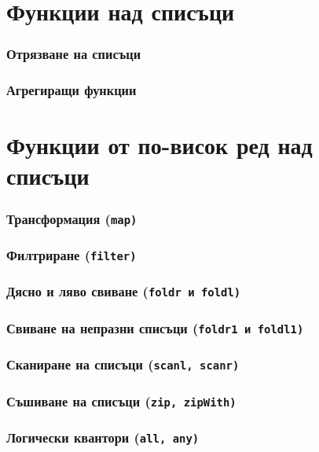 \documentclass{beamer}
\begin{document}
\section{Функции над списъци}

\begin{frame}
  \frametitle{Отрязване на списъци}
\end{frame}

\begin{frame}
  \frametitle{Агрегиращи функции}
\end{frame}

\section{Функции от по-висок ред над списъци}

\begin{frame}
  \frametitle{Трансформация (\tt{map})}
  
\end{frame}

\begin{frame}
  \frametitle{Филтриране (\tt{filter})}
  
\end{frame}

\begin{frame}
  \frametitle{Дясно и ляво свиване (\tt{foldr} и \tt{foldl})}
  
\end{frame}

\begin{frame}
  \frametitle{Свиване на непразни списъци (\tt{foldr1} и \tt{foldl1})}
  
\end{frame}

\begin{frame}
  \frametitle{Сканиране на списъци (\tt{scanl}, \tt{scanr})}
  
\end{frame}


\begin{frame}
  \frametitle{Съшиване на списъци (\tt{zip}, \tt{zipWith})}
  
\end{frame}

\begin{frame}
  \frametitle{Разбиване на списъци (\tt{break}, \tt{span}, \tt{takeWhile}, \tt{dropWhile}) 
  
\end{frame}

\begin{frame}
  \frametitle{Логически квантори (\tt{all}, \tt{any})}
  
\end{frame}
\end{document}
